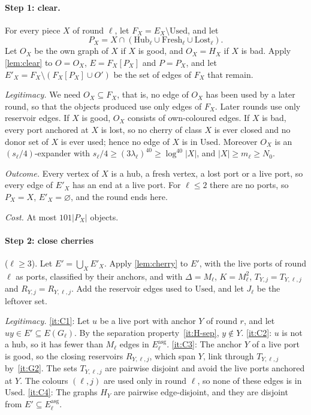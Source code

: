 \documentclass[11pt]{article}
\theoremstyle{definition}
\theoremstyle{remark}
\numberwithin{equation}{section}
\numberwithin{figure}{section}
\numberwithin{table}{section}
\newcommand{\Hub}{\mathrm{Hub}}
\newcommand{\Fresh}{\mathrm{Fresh}}
\newcommand{\Lost}{\mathrm{Lost}}
\newcommand{\Used}{\mathrm{Used}}
\newcommand{\Eas}{E^{\mathrm{asg}}}
\begin{document}
\paragraph{Step 1: clear.} For every piece $X$ of round $\ell$, let
$F_X=E_X\setminus\Used$, and let
\[
P_X=X\cap(\Hub_\ell\cup\Fresh_\ell\cup\Lost_\ell).
\]
Let $O_X$ be the own graph of $X$ if $X$ is good, and $O_X=H_X$ if $X$ is bad.
Apply \cref{lem:clear} to $O=O_X$, $E=F_X[P_X]$ and $P=P_X$, and let
$E'_X=F_X\setminus(F_X[P_X]\cup O')$ be the set of edges of $F_X$ that remain.

\emph{Legitimacy.} We need $O_X\subseteq F_X$, that is, no edge of $O_X$ has
been used by a later round, so that the objects produced use only edges of
$F_X$. Later rounds use only reservoir edges. If $X$ is good, $O_X$ consists of
own-coloured edges. If $X$ is bad, every port anchored at $X$ is lost, so no
cherry of class $X$ is ever closed and no donor set of $X$ is ever used; hence
no edge of $X$ is in $\Used$. Moreover $O_X$ is an $(s_\ell/4)$-expander with
$s_\ell/4\ge(3\lambda_\ell)^{40}\ge\log^{40}|X|$, and $|X|\ge m_\ell\ge N_0$.

\emph{Outcome.} Every vertex of $X$ is a hub, a fresh vertex, a lost port or a
live port, so every edge of $E'_X$ has an end at a live port. For $\ell\le2$
there are no ports, so $P_X=X$, $E'_X=\varnothing$, and the round ends here.

\emph{Cost.} At most $101|P_X|$ objects.

\paragraph{Step 2: close cherries} ($\ell\ge3$). Let $E'=\bigcup_XE'_X$. Apply
\cref{lem:cherry} to $E'$, with the live ports of round $\ell$ as ports,
classified by their anchors, and with $\Delta=M_\ell$, $K=M_\ell^2$,
$T_{Y,j}=T_{Y,\ell,j}$ and $R_{Y,j}=R_{Y,\ell,j}$. Add the reservoir edges used
to $\Used$, and let $J_\ell$ be the leftover set.

\emph{Legitimacy.} \ref{it:C1}: Let $u$ be a live port with anchor $Y$ of round
$r$, and let $uy\in E'\subseteq E(G_\ell)$. By the separation
property~\ref{it:H-sep}, $y\notin Y$. \ref{it:C2}: $u$ is not a hub, so it has
fewer than $M_\ell$ edges in $\Eas_\ell$. \ref{it:C3}: The anchor $Y$ of a live
port is good, so the closing reservoirs $R_{Y,\ell,j}$, which span $Y$, link
through $T_{Y,\ell,j}$ by~\ref{it:G2}. The sets $T_{Y,\ell,j}$ are pairwise
disjoint and avoid the live ports anchored at $Y$. The colours $(\ell,j)$ are
used only in round $\ell$, so none of these edges is in $\Used$. \ref{it:C4}:
The graphs $H_Y$ are pairwise edge-disjoint, and they are disjoint from
$E'\subseteq\Eas_\ell$.
\end{document}
